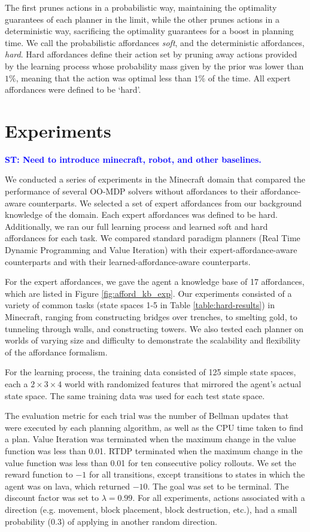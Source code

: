 \documentclass[conference]{IEEEtran}
\newcommand{\stnote}[1]{\textcolor{Blue}{\textbf{ST: #1}}}
\begin{document}
The first prunes actions in a probabilistic way, maintaining the
optimality guarantees of each planner in the limit, while the other
prunes actions in a deterministic way, sacrificing the optimality
guarantees for a boost in planning time. We call the probabilistic
affordances {\em soft}, and the deterministic affordances, {\em hard}.
Hard affordances define their action set by pruning away actions
provided by the learning process whose probability mass given by the
prior was lower than $1\%$, meaning that the action was optimal less
than $1\%$ of the time. All expert affordances were defined to be
`hard'.

\section{Experiments}
\label{sec:experiments}

\stnote{Need to introduce minecraft, robot, and other baselines.}

We conducted a series of experiments in the Minecraft domain that
compared the performance of several OO-MDP solvers without affordances
to their affordance-aware counterparts. We selected a set of expert
affordances from our background knowledge of the domain. Each expert
affordances was defined to be hard. Additionally, we ran our full
learning process and learned soft and hard affordances for each
task. We compared standard paradigm planners (Real Time Dynamic
Programming and Value Iteration) with their expert-affordance-aware
counterparts and with their learned-affordance-aware counterparts.

For the expert affordances, we gave the agent a knowledge base of 17 affordances,
which are listed in Figure \ref{fig:afford_kb_exp}.  Our experiments
consisted of a variety of common tasks (state spaces 1-5 in Table \ref{table:hard-results}) in Minecraft, ranging from
constructing bridges over trenches, to smelting gold, to tunneling
through walls, and constructing towers.  We also tested each planner on worlds of varying size
and difficulty to demonstrate the scalability and flexibility of the
affordance formalism.

For the learning process, the training data consisted of 125 simple state
spaces, each a $2\times3\times4$ world with randomized features that mirrored the agent's actual state space. The same training data was used
for each test state space.

The evaluation metric for each trial was the
number of Bellman updates that were executed by each planning
algorithm, as well as the CPU time taken to find a plan. Value Iteration was terminated when the maximum change in
the value function was less than 0.01. RTDP terminated when the
maximum change in the value function was less than 0.01 for ten
consecutive policy rollouts. We set the reward function to $-1$ for all transitions, except
transitions to states in which the agent was on lava, which returned 
$-10$. The goal was set to be terminal. The discount
factor was set to $\lambda = 0.99$. For all experiments, actions associated with
a direction (e.g. movement, block placement, block destruction, etc.), had a small 
probability ($0.3$) of applying in another random direction.
\end{document}
